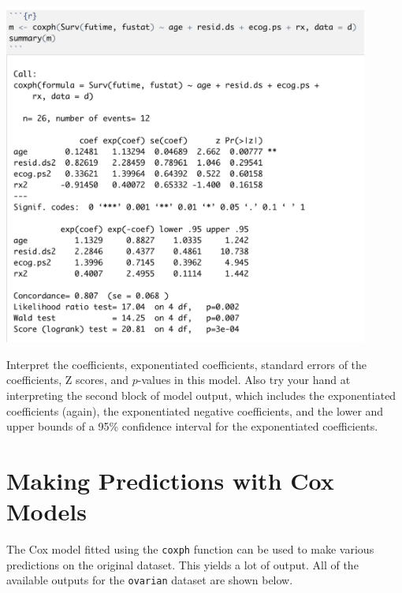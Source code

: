 \begin{center}
\includegraphics[width=0.9\textwidth]{img/ovarian-coxph-model.png}
\end{center}

\vspace{3mm}

\begin{question}{}
Interpret the coefficients, exponentiated coefficients, standard errors of the coefficients, Z scores, and $p$-values in this model. Also try your hand at interpreting the second block of model output, which includes the exponentiated coefficients (again), the exponentiated negative coefficients, and the lower and upper bounds of a 95\% confidence interval for the exponentiated coefficients.
\end{question}


\section{Making Predictions with Cox Models}

The Cox model fitted using the \texttt{coxph} function can be used to make various predictions on the original dataset. This yields a lot of output. All of the available outputs for the \texttt{ovarian} dataset are shown below. 

